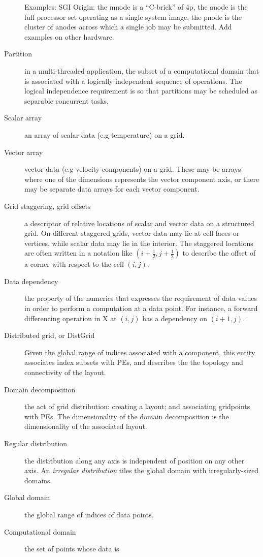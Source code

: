 \begin{description}
  Examples: SGI Origin: the mnode is a ``C-brick'' of 4p, the anode is
  the full processor set operating as a single system image, the pnode
  is the cluster of anodes across which a single job may be
  submitted. Add examples on other hardware.
\item[Partition] in a multi-threaded application, the subset of a
  computational domain that is associated with a logically independent
  sequence of operations. The logical independence requirement is so
  that partitions may be scheduled as separable concurrent tasks.
\item[Scalar array] an array of scalar data (e.g temperature) on a
  grid.
\item[Vector array] vector data (e.g velocity components) on a
  grid. These may be arrays where one of the dimensions represents the
  vector component axis, or there may be separate data arrays for each
  vector component.
\item[Grid staggering, grid offsets] a descriptor of relative locations
  of scalar and vector data on a structured grid. On different
  staggered grids, vector data may lie at cell faces or vertices,
  while scalar data may lie in the interior. The staggered locations
  are often written in a notation like $(i+\frac12,j+\frac12)$ to
  describe the offset of a corner with respect to the cell $(i,j)$.
\item[Data dependency] the property of the numerics that expresses the
  requirement of data values in order to perform a
  computation at a data point. For instance, a forward differencing
  operation in X at $(i,j)$ has a dependency on $(i+1,j)$.
\item[Distributed grid, or DistGrid] Given the global range of indices
  associated with a component, this entity associates index subsets
  with PEs, and describes the the topology and connectivity of the
  layout.
\item[Domain decomposition] the act of grid distribution: creating a
  layout; and associating gridpoints with PEs. The dimensionality
  of the domain decomposition is the dimensionality of the associated
  layout.
\item[Regular distribution] the distribution along any axis is
  independent of position on any other axis. An \emph{irregular
    distribution} tiles the global domain with irregularly-sized
  domains.
\item[Global domain] the global range of indices of data points.
\item[Computational domain] the set of points whose data is

\end{description}
